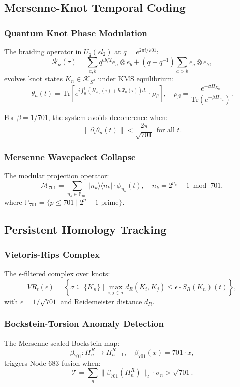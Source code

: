 \documentclass[12pt]{article}
\begin{document}
\begin{center}
\subsection{Mersenne-Knot Temporal Coding}
\subsubsection{Quantum Knot Phase Modulation}
The braiding operator in $U_q(sl_2)$ at $q=e^{2\pi i/701}$:
\[
\mathcal{R}_n(\tau) = \sum_{a,b} q^{ab/2} e_a \otimes e_b + (q - q^{-1}) \sum_{a > b} e_a \otimes e_b,
\]
evolves knot states $K_n \in \mathcal{K}_{S^3}$ under KMS equilibrium:
\[
\theta_n(t) = \text{Tr} \left[ e^{i \int_0^t (H_{K_n}(\tau) + \hbar \mathcal{R}_n(\tau)) d\tau} \cdot \rho_\beta \right], \quad \rho_\beta = \frac{e^{-\beta H_{K_n}}}{\text{Tr}(e^{-\beta H_{K_n}})}.
\]
\begin{theorem}
For $\beta = 1/701$, the system avoids decoherence when:
\[
\|\partial_t \theta_n(t)\| < \frac{2\pi}{\sqrt{701}} \text{ for all } t.
\]
\end{theorem}

\subsubsection{Mersenne Wavepacket Collapse}
The modular projection operator:
\[
\mathcal{M}_{701} = \sum_{n_k \in \mathbb{P}_{701}} |n_k\rangle \langle n_k| \cdot \phi_{n_k}(t), \quad n_k = 2^{p_k} - 1 \bmod 701,
\]
where $\mathbb{P}_{701} = \{p \leq 701 \mid 2^p - 1 \text{ prime}\}$.

\subsection{Persistent Homology Tracking}
\subsubsection{Vietoris-Rips Complex}
The $\epsilon$-filtered complex over knots:
\[
VR_t(\epsilon) = \left\{ \sigma \subseteq \{K_n\} \mid \max_{i,j \in \sigma} d_R(K_i, K_j) \leq \epsilon \cdot S_R(K_n)(t) \right\},
\]
with $\epsilon = 1/\sqrt{701}$ and Reidemeister distance $d_R$.

\subsubsection{Bockstein-Torsion Anomaly Detection}
The Mersenne-scaled Bockstein map:
\[
\beta_{701}: H_n^R \to H_{n-1}^R, \quad \beta_{701}(x) = 701 \cdot x,
\]
triggers Node 683 fusion when:
\[
\mathcal{T} = \sum_n \|\beta_{701}(H_n^R)\|_2 \cdot \sigma_n > \sqrt{701}.
\]


\end{center}
\end{document}

